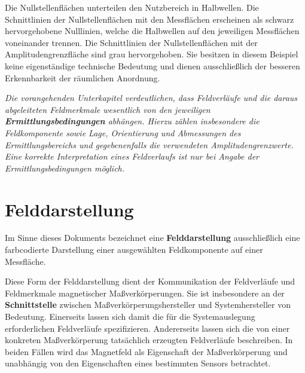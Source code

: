 \documentclass[
  ngerman,
  a4paper,
  twoside]{scrbook}
\newcounter{quartocallouttipno}
\newcommand{\quartocallouttip}[1]{\refstepcounter{quartocallouttipno}\label{#1}}
\begin{document}
Die Nullstellenflächen unterteilen den Nutzbereich in Halbwellen. Die
Schnittlinien der Nullstellenflächen mit den Messflächen erscheinen als
schwarz hervorgehobene Nulllinien, welche die Halbwellen auf den
jeweiligen Messflächen voneinander trennen. Die Schnittlinien der
Nullstellenflächen mit der Amplitudengrenzfläche sind grau
hervorgehoben. Sie besitzen in diesem Beispiel keine eigenständige
technische Bedeutung und dienen ausschließlich der besseren
Erkennbarkeit der räumlichen Anordnung.

\begin{tcolorbox}[enhanced jigsaw, arc=.35mm, bottomrule=.15mm, bottomtitle=1mm, breakable, colback=white, colbacktitle=quarto-callout-tip-color!10!white, colframe=quarto-callout-tip-color-frame, coltitle=black, left=2mm, leftrule=.75mm, opacityback=0, opacitybacktitle=0.6, rightrule=.15mm, title=\textcolor{quarto-callout-tip-color}{\faLightbulb}\hspace{0.5em}{Hinweis \ref*{tip-05-ermittlungsbedingungen}}, titlerule=0mm, toprule=.15mm, toptitle=1mm]

\quartocallouttip{tip-05-ermittlungsbedingungen} 

\emph{Die vorangehenden Unterkapitel verdeutlichen, dass Feldverläufe
und die daraus abgeleiteten Feldmerkmale wesentlich von den jeweiligen
\textbf{Ermittlungsbedingungen} abhängen. Hierzu zählen insbesondere die
Feldkomponente sowie Lage, Orientierung und Abmessungen des
Ermittlungsbereichs und gegebenenfalls die verwendeten
Amplitudengrenzwerte. Eine korrekte Interpretation eines Feldverlaufs
ist nur bei Angabe der Ermittlungsbedingungen möglich.}

\end{tcolorbox}

\section{Felddarstellung}\label{sec-05-felddarstellung}

Im Sinne dieses Dokuments bezeichnet eine \textbf{Felddarstellung}
ausschließlich eine farbcodierte Darstellung einer ausgewählten
Feldkomponente auf einer Messfläche.

Diese Form der Felddarstellung dient der Kommunikation der Feldverläufe
und Feldmerkmale magnetischer Maßverkörperungen. Sie ist insbesondere an
der \textbf{Schnittstelle} zwischen Maßverkörperungshersteller und
Systemhersteller von Bedeutung. Einerseits lassen sich damit die für die
Systemauslegung erforderlichen Feldverläufe spezifizieren. Andererseits
lassen sich die von einer konkreten Maßverkörperung tatsächlich
erzeugten Feldverläufe beschreiben. In beiden Fällen wird das Magnetfeld
als Eigenschaft der Maßverkörperung und unabhängig von den Eigenschaften
eines bestimmten Sensors betrachtet.
\end{document}
